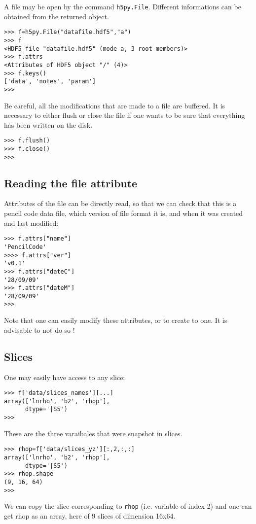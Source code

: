 \documentclass[a4paper,12pt]{article}
\begin{document}
A file may be open by the command \texttt{h5py.File}. Different
informations can be obtained from the returned object.
\begin{verbatim}
>>> f=h5py.File("datafile.hdf5","a")
>>> f
<HDF5 file "datafile.hdf5" (mode a, 3 root members)>
>>> f.attrs
<Attributes of HDF5 object "/" (4)>
>>> f.keys()
['data', 'notes', 'param']
>>>
\end{verbatim}

Be careful, all the modifications that are made to a file are
buffered. It is necessary to either flush or close the file if one
wants to be sure that everything has been written on the disk.
\begin{verbatim}
>>> f.flush()
>>> f.close()
>>>
\end{verbatim}

\subsection{Reading the file attribute}
\label{sec:read-file-attr}

Attributes of the file can be directly read, so that we can check that
this is a pencil code data file, which version of file format it is,
and when it was created and last modified:
\begin{verbatim}
>>> f.attrs["name"]
'PencilCode'
>>>> f.attrs["ver"]
'v0.1'
>>> f.attrs["dateC"]
'28/09/09'
>>> f.attrs["dateM"]
'28/09/09'
>>>
\end{verbatim}
Note that one can easily modify these attributes, or to create to
one. It is advisable to not do so !

\subsection{Slices}
\label{sec:slices}

One may easily have access to any slice:
\begin{verbatim}
>>> f['data/slices_names'][...]
array(['lnrho', 'b2', 'rhop'], 
      dtype='|S5')
>>>
\end{verbatim}
These are the three varaibales that were snapshot in slices.
\begin{verbatim}
>>> rhop=f['data/slices_yz'][:,2,:,:]
array(['lnrho', 'b2', 'rhop'], 
      dtype='|S5')
>>> rhop.shape
(9, 16, 64)
>>>
\end{verbatim}
We can copy the slice corresponding to \texttt{rhop} (i.e. variable of
index 2) and one can get rhop as an array, here of 9 slices of
dimension 16x64.
\end{document}
